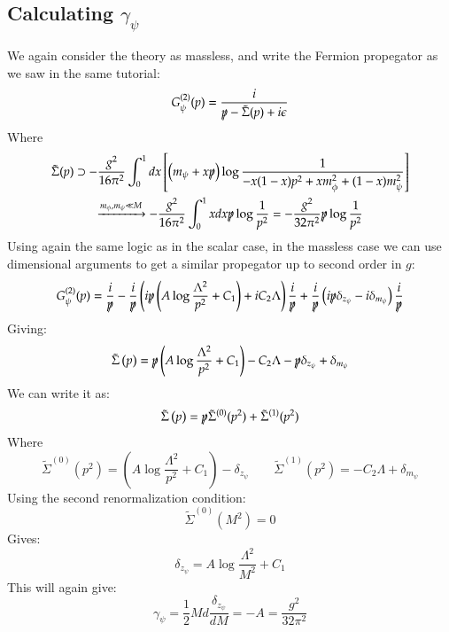 \documentclass{article}
\begin{document}
\subsection{Calculating $\gamma_\psi$}
We again consider the theory as massless, and write the Fermion propegator as we saw in the same tutorial:
\begin{equation}
    G^{(2)}_\psi (p) = \frac{i}{\slashed{p} - \tilde{\Sigma}(p) + i\epsilon}
\end{equation}
Where
\begin{equation}
\begin{gathered}
    \tilde{\Sigma}(p) \supset -\frac{g^2}{16\pi^2} \int_0^1 dx \left[
        \left(m_\psi + x\slashed{p}\right)\log\frac{1}{- x(1 - x)p^2 + xm_\phi^2 + (1 - x)m_\psi^2}
    \right] \\ \xrightarrow{m_\phi, m_\psi \ll M}
    -\frac{g^2}{16\pi^2} \int_0^1 x dx 
        \slashed{p}\log\frac{1}{p^2} = -\frac{g^2}{32\pi^2}\slashed{p}\log\frac{1}{p^2}
\end{gathered}
\end{equation}
Using again the same logic as in the scalar case, in the massless case we can use dimensional arguments to get a similar propegator up to second order in $g$:
\begin{equation}
    G^{(2)}_\psi(p) = \frac{i}{\slashed{p}} - \frac{i}{\slashed{p}}\left(i\slashed{p} \left(A \log\frac{\Lambda^2}{p^2} + C_1\right) + iC_2\Lambda\right)\frac{i}{\slashed{p}} + \frac{i}{\slashed{p}}\left(i\slashed{p}\delta_{z_\psi} - i\delta_{m_\psi}\right)\frac{i}{\slashed{p}}
\end{equation}
Giving:
\begin{equation}
    \tilde{\Sigma}\left(p\right) = \slashed{p} \left(A \log\frac{\Lambda^2}{p^2} + C_1\right) - C_2\Lambda - \slashed{p}\delta_{z_\psi} + \delta_{m_\psi}
\end{equation}
We can write it as:
\begin{equation}
    \tilde{\Sigma}\left(p\right) = \slashed{p} \tilde{\Sigma}^{(0)}(p^2) + \tilde{\Sigma}^{(1)}(p^2)
\end{equation}
Where
\begin{equation}
    \tilde{\Sigma}^{(0)}(p^2) = \left(A \log\frac{\Lambda^2}{p^2} + C_1\right) - \delta_{z_\psi}
    \qquad
    \tilde{\Sigma}^{(1)}(p^2) = -C_2\Lambda + \delta_{m_\psi}
\end{equation}
Using the second renormalization condition:
\begin{equation}
    \tilde{\Sigma}^{(0)}(M^2) = 0
\end{equation}
Gives:
\begin{equation}
    \delta_{z_\psi} = A \log\frac{\Lambda^2}{M^2} + C_1
\end{equation}
This will again give:
\begin{equation}
    \gamma_\psi = \frac{1}{2}M d\frac{\delta_{z_\psi}}{dM} = - A = \frac{g^2}{32\pi^2}
\end{equation}
\end{document}
